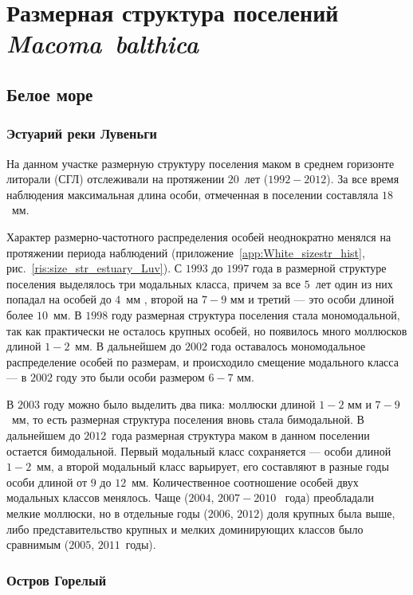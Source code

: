 	\chapter{Размерная структура поселений {\it Macoma~balthica}}

		\section{Белое море}

	\subsection*{Эстуарий реки Лувеньги}
На данном участке размерную структуру поселения маком в среднем горизонте литорали (СГЛ) отслеживали на протяжении $20$~лет ($1992 - 2012$).
За все время наблюдения максимальная длина особи, отмеченная в поселении составляла $18$~мм.

Характер размерно-частотного распределения особей неоднократно менялся на протяжении периода наблюдений (приложение~\ref{app:White_sizestr_hist}, рис.~\ref{ris:size_str_estuary_Luv}).
С $1993$ до $1997$ года в размерной структуре поселения выделялось три модальных класса, причем за все $5$~лет один из них попадал на особей до $4$~мм , второй на $7 - 9$ мм и третий --- это особи длиной более $10$~мм. 
В $1998$ году размерная структура поселения стала мономодальной, так как практически не осталось крупных особей, но
появилось много моллюсков длиной $1-2$~мм. 
В дальнейшем до $2002$ года оставалось мономодальное распределение особей по размерам, и происходило смещение модального класса --- в $2002$ году это были особи размером $6-7$ мм. 

В $2003$ году можно было выделить два пика: моллюски длиной $1-2$ мм и $7-9$~мм, то есть размерная структура поселения вновь стала бимодальной. 
В дальнейшем до $2012$~года размерная структура маком в данном поселении остается бимодальной. 
Первый модальный класс сохраняется --- особи длиной $1-2$~мм, а второй модальный класс варьирует, его составляют в разные годы особи длиной от $9$ до $12$~мм.
Количественное соотношение особей двух модальных классов менялось. Чаще ($2004$, $2007 - 2010$~ года) преобладали мелкие моллюски, но в отдельные годы ($2006$, $2012$) доля крупных была выше, либо представительство крупных и мелких доминирующих классов было сравнимым ($2005$, $2011$~годы).



	\subsection*{Остров Горелый}


